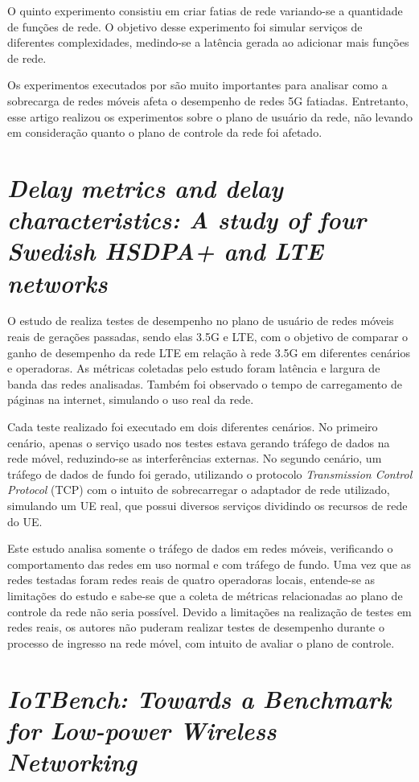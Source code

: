 O quinto experimento consistiu em criar fatias de rede variando-se a quantidade de funções de rede.
O objetivo desse experimento foi simular serviços de diferentes complexidades, medindo-se a latência gerada ao adicionar mais funções de rede.

Os experimentos executados por  são muito importantes para analisar como a sobrecarga de redes móveis afeta o desempenho de redes 5G fatiadas.
Entretanto, esse artigo realizou os experimentos sobre o plano de usuário da rede, não levando em consideração quanto o plano de controle da rede foi afetado.

\section{\textit{Delay metrics and delay characteristics: A study of four Swedish HSDPA+ and LTE networks}}

O estudo de  realiza testes de desempenho no plano de usuário de redes móveis reais de gerações passadas, sendo elas 3.5G e LTE, com o objetivo de comparar o ganho de desempenho da rede LTE em relação à rede 3.5G em diferentes cenários e operadoras.
As métricas coletadas pelo estudo foram latência e largura de banda das redes analisadas.
Também foi observado o tempo de carregamento de páginas na internet, simulando o uso real da rede.

Cada teste realizado foi executado em dois diferentes cenários.
No primeiro cenário, apenas o serviço usado nos testes estava gerando tráfego de dados na rede móvel, reduzindo-se as interferências externas.
No segundo cenário, um tráfego de dados de fundo foi gerado, utilizando o protocolo \textit{Transmission Control Protocol} (TCP) com o intuito de sobrecarregar o adaptador de rede utilizado, simulando um UE real, que possui diversos serviços dividindo os recursos de rede do UE.

Este estudo analisa somente o tráfego de dados em redes móveis, verificando o comportamento das redes em uso normal e com tráfego de fundo.
Uma vez que as redes testadas foram redes reais de quatro operadoras locais, entende-se as limitações do estudo e sabe-se que a coleta de métricas relacionadas ao plano de controle da rede não seria possível.
Devido a limitações na realização de testes em redes reais, os autores não puderam realizar testes de desempenho durante o processo de ingresso na rede móvel, com intuito de avaliar o plano de controle.

\section{\textit{IoTBench: Towards a Benchmark for Low-power Wireless Networking}}

